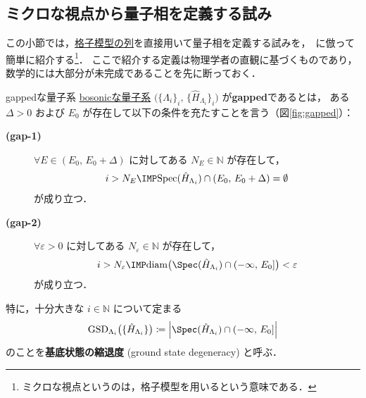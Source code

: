 \documentclass[TQFT_main]{subfiles}
\begin{document}
\subsection{ミクロな視点から量子相を定義する試み}

この小節では，\hyperref[def:bosonic-lattice-model]{格子模型の列}を直接用いて量子相を定義する試みを，~\cite{ChenGuWen2010}に倣って簡単に紹介する\footnote{ミクロな視点というのは，格子模型を用いるという意味である．}．
ここで紹介する定義は物理学者の直観に基づくものであり，数学的には大部分が未完成であることを先に断っておく．

\begin{mydefph}[label=def:gapped,breakable]{gappedな量子系}
    \hyperref[def:bosonic-lattice-model]{bosonicな量子系} $\bigl( \{\Lambda_i\}_i,\, \{\hat{H}_{\Lambda_i}\}_i \bigr)$ が\textbf{gapped}であるとは，
    ある $\Delta > 0$ および $E_0$ が存在して以下の条件を充たすことを言う（図\ref{fig:gapped}）：
    \begin{description}
        \item[\textbf{(gap-1)}] $\forall E \in (E_0,\, E_0+\Delta)$ に対してある $N_E \in \mathbb{N}$ が存在して，
        \begin{align}
            i > N_E \IMP \mathrm{Spec}(\hat{H}_{\Lambda_i}) \cap (E_0,\, E_0+\Delta) = \emptyset
        \end{align}
        が成り立つ．
        \item[\textbf{(gap-2)}] $\forall \varepsilon > 0$ に対してある $N_\varepsilon \in \mathbb{N}$ が存在して，
        \begin{align}
            i > N_\varepsilon \IMP \mathrm{diam}\bigl(\Spec (\hat{H}_{\Lambda_i}) \cap (-\infty,\, E_0] \bigr) < \varepsilon
        \end{align}
        が成り立つ．
    \end{description}
    特に，十分大きな $i \in \mathbb{N}$ について定まる
    \begin{align}
        \mathrm{GSD}_{\Lambda_i}\bigl(\{\hat{H}_{\Lambda_i}\}\bigr) \coloneqq \abs{\Spec (\hat{H}_{\Lambda_i}) \cap (-\infty,\, E_0]}
    \end{align}
    のことを\textbf{基底状態の縮退度} (ground state degeneracy) と呼ぶ．
\end{mydefph}
\end{document}
